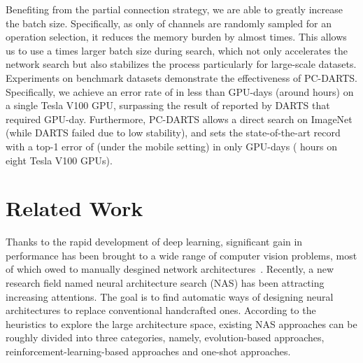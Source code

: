 \documentclass{article} \usepackage{iclr2020_conference,times}
\begin{document}
Benefiting from the partial connection strategy, we are able to greatly increase the batch size. Specifically, as only  of channels are  randomly sampled for an operation selection, it reduces the memory burden by almost  times. This allows us to use a  times larger batch size during search, which not only accelerates the network search but also stabilizes the process particularly for large-scale datasets. Experiments on benchmark datasets  demonstrate the effectiveness of PC-DARTS. Specifically, we achieve an error rate of  in less than  GPU-days (around  hours) on a single Tesla V100 GPU, surpassing the result of  reported by DARTS that required  GPU-day. Furthermore, PC-DARTS allows a direct search on ImageNet (while DARTS failed due to low stability), and sets the state-of-the-art record with a top-1 error of  (under the mobile setting) in only  GPU-days ( hours on eight Tesla V100 GPUs).







\section{Related Work}
\label{RelatedWork}

Thanks to the rapid development of deep learning, significant gain in performance has been brought to a wide range of computer vision problems, most of which owed to manually desgined network architectures~\citep{krizhevsky2012imagenet,simonyan2014very,he2016deep,huang2017densely}. Recently, a new research field named neural architecture search (NAS) has been attracting increasing attentions. The goal is to find automatic ways of designing neural architectures to replace conventional handcrafted ones. According to the heuristics to explore the large architecture space, existing NAS approaches can be roughly divided into three categories, namely, evolution-based approaches, reinforcement-learning-based approaches and one-shot approaches.
\end{document}

